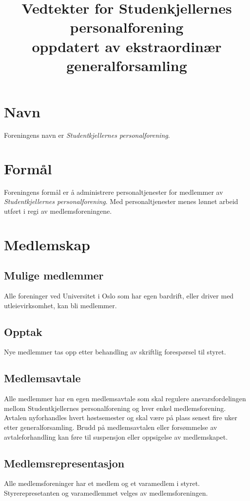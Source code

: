 \documentclass[11pt,norsk,a4paper]{article}
\author{}
\title{%
    {\LARGE\textbf{Vedtekter for Studenkjellernes personalforening}}\\%
	{\small oppdatert av ekstraordinær generalforsamling \thedate}%
}
\date{}
\begin{document}
\maketitle{}

\section{Navn\label{sec:navn}}
Foreningens navn er \emph{Studentkjellernes personalforening}.


\section{Formål\label{sec:formål}}
Foreningens formål er å administrere personaltjenester for medlemmer av 
\emph{Studentkjellernes personalforening}.
Med personaltjenester menes lønnet arbeid utført i regi av medlemsforeningene.


\section{Medlemskap\label{sec:3}}

\subsection{Mulige medlemmer}
Alle foreninger ved Universitet i Oslo som  har egen bardrift, eller driver med utleievirksomhet, kan bli medlemmer.

\subsection{Opptak}
Nye medlemmer tas opp etter behandling av skriftlig forespørsel til styret.

\subsection{Medlemsavtale}
Alle medlemmer har en egen medlemsavtale som skal regulere ansvarsfordelingen
mellom Studentkjellernes personalforening og hver enkel medlemsforening.
Avtalen nyforhandles hvert høstsemester og skal være på plass senest
fire uker etter generalforsamling. 
Brudd på medlemsavtalen eller forsømmelse av avtaleforhandling
kan føre til suspensjon eller oppsigelse av medlemskapet.

\subsection{Medlemsrepresentasjon\label{sec:medlemsrepresentanter}}
Alle medlemsforeninger har et medlem og et varamedlem i styret.
Styrerepresetanten og varamedlemmet velges av medlemsforeningen.
\end{document}
